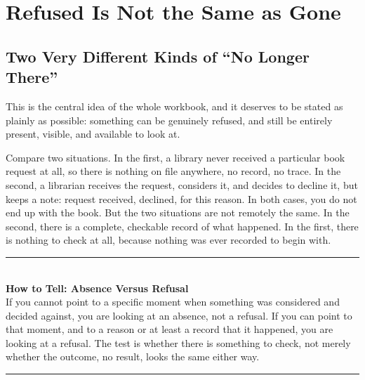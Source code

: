 \documentclass[11pt]{book}
\newenvironment{algorithmproc}[1]{%
\vspace{0.6em}\noindent\rule{\linewidth}{0.6pt}\\[0.2em]\textbf{How to Tell: #1}\\[0.3em]}%
{\\[0.2em]\noindent\rule{\linewidth}{0.6pt}\vspace{0.6em}}
\begin{document}
\chapter{Refused Is Not the Same as Gone}

\section{Two Very Different Kinds of ``No Longer There''}

This is the central idea of the whole workbook, and it deserves to be stated as plainly as possible: something can be genuinely refused, and still be entirely present, visible, and available to look at.

Compare two situations. In the first, a library never received a particular book request at all, so there is nothing on file anywhere, no record, no trace. In the second, a librarian receives the request, considers it, and decides to decline it, but keeps a note: request received, declined, for this reason. In both cases, you do not end up with the book. But the two situations are not remotely the same. In the second, there is a complete, checkable record of what happened. In the first, there is nothing to check at all, because nothing was ever recorded to begin with.

\begin{center}
\end{center}

\begin{algorithmproc}{Absence Versus Refusal}
If you cannot point to a specific moment when something was considered and decided against, you are looking at an absence, not a refusal. If you can point to that moment, and to a reason or at least a record that it happened, you are looking at a refusal. The test is whether there is something to check, not merely whether the outcome, no result, looks the same either way.
\end{algorithmproc}
\end{document}
